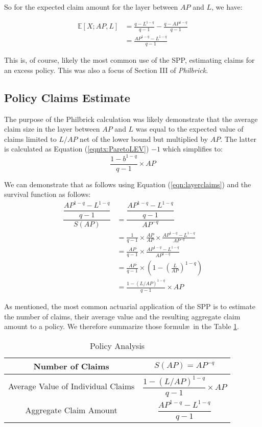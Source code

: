 \documentclass[]{article} %
\newcommand{\philbrick}{\textit{Philbrick}}
\begin{document}
So for the expected claim amount for the layer between $AP$ and $L$, we have:

\begin{align}
\mathbb{E}[X;AP, L] &= \frac{q - L^{1-q}}{q-1} - \frac{q - AP^{1-q}}{q-1}\nonumber \\
&= \frac{AP^{1-q} - L^{1-q}}{q-1}\label{eqn:layerclaims}
\end{align}

This is, of course, likely the most common use of the SPP, estimating claims for an excess policy. This was also a focus of Section III of \philbrick. 

\subsection{Policy Claims Estimate}
The purpose of the Philbrick calculation was likely demonstrate that the average claim size in the layer between $AP$ and $L$ was equal to the expected value of claims limited to $L / AP$ net of the lower bound but multiplied by $AP$. The latter is calculated as Equation (\ref{eqntx:ParetoLEV}) $- 1$ which simplifies to:
\begin{equation}
\frac{1 - b^{1-q}}{q-1} \times AP
\end{equation}


We can demonstrate that as follows using Equation (\ref{eqn:layerclaims}) and the survival function as follows:
\begin{align}
\dfrac{\dfrac{AP^{1-q} - L^{1-q}}{q-1}}{S(AP)} &= 
\dfrac{\dfrac{AP^{1-q} - L^{1-q}}{q-1}}{AP^{-q}}\nonumber\\
&= \frac{1}{q-1} \times \frac{AP}{AP} \times \frac{AP^{1-q} - L^{1-q}}{AP^{-q}}\nonumber\\
&= \frac{AP}{q-1} \times \frac{AP^{1-q} - L^{1-q}}{AP^{1-q}}\nonumber\\
&= \frac{AP}{q-1} \times \left(1 - \left(\frac{L}{AP}\right)^{1-q}\right)\nonumber\\
&= \frac{1 - (L/AP)^{1-q}}{q-1} \times AP
\end{align}

As mentioned, the most common actuarial application of the SPP is to estimate the number of claims, their average value and the resulting aggregate claim amount to a policy. We therefore summarize those formul\ae~in the Table \ref{tbl:PolicyFormulas}.
\begin{table}[h!]
	\centering
	\begin{tabular}[h]{cc}
		\toprule
		Number of Claims & $S(AP) = AP^{-q}$\\ \midrule
		Average Value of Individual Claims & $\dfrac{1 - (L/AP)^{1-q}}{q-1} \times AP$\\ \midrule
		Aggregate Claim Amount & $\dfrac{AP^{1-q} - L^{1-q}}{q-1}$\\
		\bottomrule
	\end{tabular}
	\caption{Policy Analysis}\label{tbl:PolicyFormulas}			
\end{table}
\end{document}
